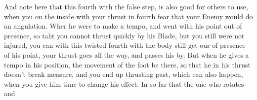 And note here that this fourth with the false step, is also good for
others to use, when you on the inside with your thrust in fourth fear
that your Enemy would do an angulation. Wher he were to make a tempo,
and went with his point out of presence, so taht you cannot thrust
quickly by his Blade, but you still were not injured,
you can with this twisted fourth with the body still get our of
presence of his point, your thrust goes all the way, and passes his
by. But when he gives a tempo in his position, the movement of the
foot be there, so that he in his thrust doesn't break measure, and you
end up thrusting past, which can also happen, when you give him time
to change his effect. In so far that the one who rotates and